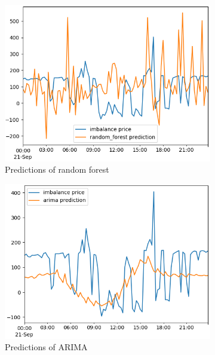 \documentclass[class=scrbook, crop=false]{standalone}
\begin{document}
\begin{figure}
  \centering
\begin{subfigure}{0.45\textwidth}
  \includegraphics[width=\linewidth]{../images/results/random_forest_prediction.png}
  \caption{Predictions of random forest}
\end{subfigure}
\begin{subfigure}{0.45\textwidth}
  \includegraphics[width=\linewidth]{../images/results/arima_prediction.png}
  \caption{Predictions of ARIMA}
\end{subfigure}
\begin{subfigure}{0.45\textwidth}

\end{subfigure}
\end{figure}
\end{document}
